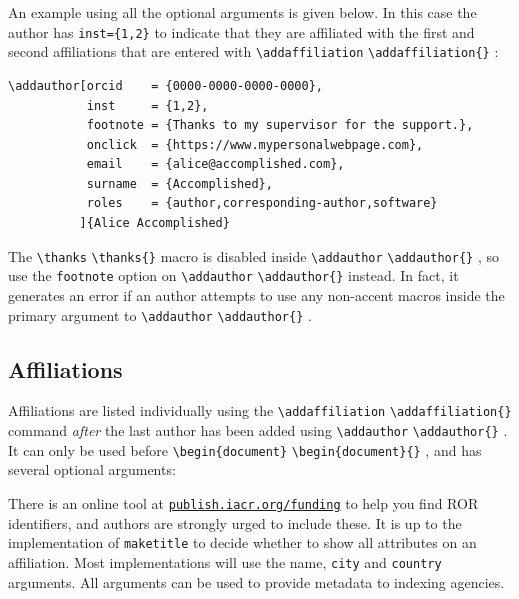 \documentclass{article}
\newcommand{\cmd}[2][]{%
  \def\FirstArg{#1}%
  \ifx\FirstArg\empty%
    \texttt{\textbackslash{}#2}%
  \else%
    \texttt{\textbackslash{}#2\{#1\}}%
  \fi
}
\begin{document}
An example using all the optional arguments is given below. In this case
the author has \verb+inst={1,2}+ to indicate that they are affiliated with
the first and second affiliations that are entered with
\cmd{addaffiliation}:

\begin{Verbatim}[samepage=true]
\addauthor[orcid    = {0000-0000-0000-0000},
           inst     = {1,2},
           footnote = {Thanks to my supervisor for the support.},
           onclick  = {https://www.mypersonalwebpage.com},
           email    = {alice@accomplished.com},
           surname  = {Accomplished},
           roles    = {author,corresponding-author,software}
          ]{Alice Accomplished}
\end{Verbatim}

The \cmd{thanks} macro is disabled
inside \cmd{addauthor}, so use the \verb+footnote+ option
on \cmd{addauthor} instead. In fact, it
generates an error if an author attempts to use any
non-accent macros inside the primary argument to \cmd{addauthor}.
\subsection{Affiliations}
Affiliations are listed individually using the \cmd{addaffiliation} command
\emph{after} the last author has been added using \cmd{addauthor}. It can
only be used before \cmd{begin\{document\}}, and has several optional arguments:

\begin{center}
\begin{arglist}
\end{arglist}
\end{center}

\noindent There is an online tool at
\href{https://publish.iacr.org/funding}{\texttt{publish.iacr.org/funding}}
to help you find ROR identifiers, and authors are strongly urged to
include these.
It is up to the implementation of \texttt{maketitle} to decide whether to show all
attributes on an affiliation. Most implementations will use the name, \verb+city+ and
\verb+country+ arguments. All arguments can be used to provide metadata
to indexing agencies.
\end{document}
